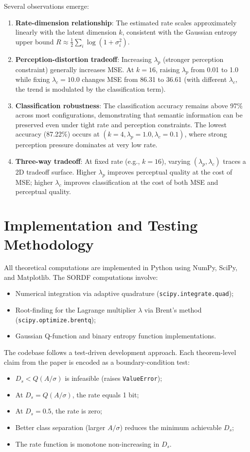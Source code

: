 \documentclass[conference]{IEEEtran}
\begin{document}
Several observations emerge:
\begin{enumerate}
    \item \textbf{Rate-dimension relationship}: The estimated rate scales approximately linearly with the latent dimension $k$, consistent with the Gaussian entropy upper bound $R \approx \frac{1}{2}\sum_i \log(1 + \sigma_i^2)$.
    \item \textbf{Perception-distortion tradeoff}: Increasing $\lambda_p$ (stronger perception constraint) generally increases MSE. At $k=16$, raising $\lambda_p$ from 0.01 to 1.0 while fixing $\lambda_c=10.0$ changes MSE from 86.31 to 36.61 (with different $\lambda_c$, the trend is modulated by the classification term).
    \item \textbf{Classification robustness}: The classification accuracy remains above 97\% across most configurations, demonstrating that semantic information can be preserved even under tight rate and perception constraints. The lowest accuracy (87.22\%) occurs at $(k=4, \lambda_p=1.0, \lambda_c=0.1)$, where strong perception pressure dominates at very low rate.
    \item \textbf{Three-way tradeoff}: At fixed rate (e.g., $k=16$), varying $(\lambda_p, \lambda_c)$ traces a 2D tradeoff surface. Higher $\lambda_p$ improves perceptual quality at the cost of MSE; higher $\lambda_c$ improves classification at the cost of both MSE and perceptual quality.
\end{enumerate}

\section{Implementation and Testing Methodology}

All theoretical computations are implemented in Python using NumPy, SciPy, and Matplotlib. The SORDF computations involve:
\begin{itemize}
    \item Numerical integration via adaptive quadrature (\texttt{scipy.integrate.quad});
    \item Root-finding for the Lagrange multiplier $\lambda$ via Brent's method (\texttt{scipy.optimize.brentq});
    \item Gaussian Q-function and binary entropy function implementations.
\end{itemize}

The codebase follows a test-driven development approach. Each theorem-level claim from the paper is encoded as a boundary-condition test:
\begin{itemize}
    \item $D_s < Q(A/\sigma)$ is infeasible (raises \texttt{ValueError});
    \item At $D_s = Q(A/\sigma)$, the rate equals 1 bit;
    \item At $D_s = 0.5$, the rate is zero;
    \item Better class separation (larger $A/\sigma$) reduces the minimum achievable $D_s$;
    \item The rate function is monotone non-increasing in $D_s$.
\end{itemize}
\end{document}
